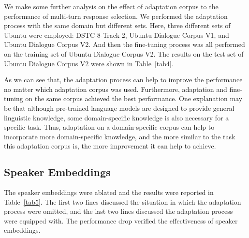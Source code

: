 \documentclass[sigconf]{acmart}
\begin{document}
    We make some further analysis on the effect of adaptation corpus to the performance of multi-turn response selection.
    We performed the adaptation process with the same domain but different sets.
    Here, three different sets of Ubuntu were employed: DSTC 8-Track 2, Ubuntu Dialogue Corpus V1, and Ubuntu Dialogue Corpus V2.
    And then the fine-tuning process was all performed on the training set of Ubuntu Dialogue Corpus V2.
    The results on the test set of Ubuntu Dialogue Corpus V2 were shown in Table~\ref{tab4}.

    As we can see that, the adaptation process can help to improve the performance no matter which adaptation corpus was used.
    Furthermore, adaptation and fine-tuning on the same corpus achieved the best performance.
    One explanation may be that although pre-trained language models are designed to provide general linguistic knowledge, some domain-specific knowledge is also necessary for a specific task.
    Thus, adaptation on a domain-specific corpus can help to incorporate more domain-specific knowledge, and the more similar to the task this adaptation corpus is, the more improvement it can help to achieve.

  \subsection{Speaker Embeddings}
  
    \begin{table}[!hbt]
\caption{Results on the test set of Ubuntu Corpus V2, by ablating the speaker embeddings (SE).}
      \centering
      \label{tab5}
    \end{table}

    The speaker embeddings were ablated and the results were reported in Table~\ref{tab5}.
    The first two lines discussed the situation in which the adaptation process were omitted, and the last two lines discussed the adaptation process were equipped with.
    The performance drop verified the effectiveness of speaker embeddings.
\end{document}
